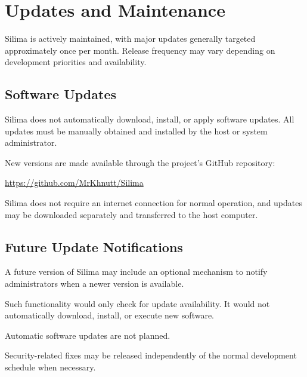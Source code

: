 \section{Updates and Maintenance}

Silima is actively maintained, with major updates generally
targeted approximately once per month. Release frequency
may vary depending on development priorities and
availability.

\subsection{Software Updates}

Silima does not automatically download, install, or apply
software updates. All updates must be manually obtained
and installed by the host or system administrator.

New versions are made available through the project's
GitHub repository:

\url{https://github.com/MrKhnutt/Silima}

Silima does not require an internet connection for
normal operation, and updates may be downloaded separately
and transferred to the host computer.

\subsection{Future Update Notifications}

A future version of Silima may include an optional
mechanism to notify administrators when a newer version
is available.

Such functionality would only check for update
availability. It would not automatically download,
install, or execute new software.

Automatic software updates are not planned.

Security-related fixes may be released independently of the normal development schedule when necessary.
